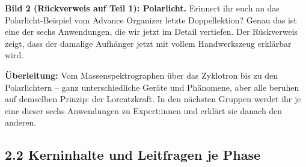\documentclass[11pt,a4paper]{article}
\begin{document}
\textbf{Bild 2 (Rückverweis auf Teil 1): Polarlicht.} \glqq Erinnert ihr
euch an das Polarlicht-Beispiel vom Advance Organizer letzte
Doppellektion? Genau das ist eine der sechs Anwendungen, die wir jetzt im
Detail vertiefen.\grqq{} Der Rückverweis zeigt, dass der damalige
Aufhänger jetzt mit vollem Handwerkszeug erklärbar wird.

\textbf{Überleitung:} \glqq Vom Massenspektrographen über das Zyklotron
bis zu den Polarlichtern -- ganz unterschiedliche Geräte und Phänomene,
aber alle beruhen auf demselben Prinzip: der Lorentzkraft. In den
nächsten Gruppen werdet ihr je eine dieser sechs Anwendungen zu
Expert:innen und erklärt sie danach den anderen.\grqq{}

\subsection*{2.2 Kerninhalte und Leitfragen je Phase}
\end{document}
